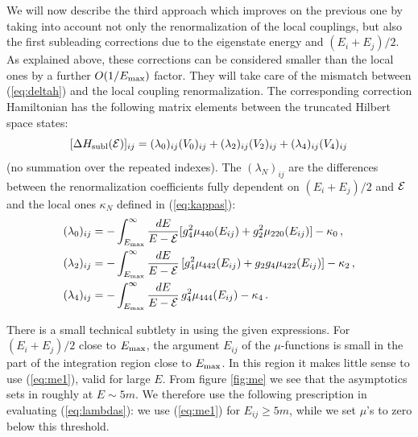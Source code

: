 \documentclass[11pt]{article}
\newcommand{\reef}[1]{(\ref{#1})}
\def\nn{\nonumber}
\def\calE {{\cal E}}
\def\ge{\geqslant}
\def \Emax{E_{\rm max}}
\numberwithin{equation}{section}
\begin{document}

\noindent We will now describe the third approach which improves on the previous one by taking into account not only the renormalization of the local couplings, but also the first subleading corrections due to the eigenstate energy and ${(E_i+E_j)}/{2}$. As explained above, these corrections can be considered smaller than the local ones by a further $O({1}/{\Emax})$ factor. They will take care of the mismatch between \reef{eq:deltah} and the local coupling renormalization. The corresponding correction Hamiltonian has the following matrix elements between the truncated Hilbert space states: 
\begin{equation}
\label{eq:subl}
[\Delta H_{\rm subl}(\calE)]_{i j} =(\lambda_{0})_{i j} (V_0)_{i j} + (\lambda_{2})_{i j} (V_2)_{i j} +  (\lambda_{4})_{i j} (V_4)_{i j}\,
\end{equation}
(no summation over the repeated indexes). The $(\lambda_N)_{i j}$ are the differences between the renormalization coefficients fully dependent on $(E_i+E_j)/{2}$ and $\calE$ and the local ones $\kappa_N$ defined in \reef{eq:kappas}:
\begin{align}
(\lambda_0)_{i j}&=-\int_{\Emax}^\infty\frac{dE}{E-\calE}[g_4^2 \mu_{440}(E_{i j})+ g_2^2 \mu_{220}(E_{i j})] -\kappa_0\,,\nn\\
(\lambda_2)_{i j}&=-\int_{\Emax}^\infty\frac{dE}{E-\calE}\,[g_4^2 \mu_{442}(E_{i j})+ g_2 g_4 \mu_{422}(E_{i j})]-\kappa_2\,,\label{eq:lambdas}\\
(\lambda_4)_{i j}&=-\int_{\Emax}^\infty\frac{dE}{E-\calE}\,g_4^2 \mu_{444}(E_{i j})-\kappa_4\,.\nn
\end{align}

There is a small technical subtlety in using the given expressions. For $(E_i+E_j)/2$ close to $\Emax$, the argument $E_{ij}$ of the $\mu$-functions is small in the part of the integration region close to $\Emax$. In this region it makes little sense to use \reef{eq:me1}, valid for large $E$. From figure  \ref{fig:me} we see that the asymptotics sets in roughly at $E\sim 5 m$. We therefore use the following prescription in evaluating \reef{eq:lambdas}: we use \reef{eq:me1} for $E_{ij}\ge 5m$, while we set $\mu$'s to zero below this threshold.
\end{document}
